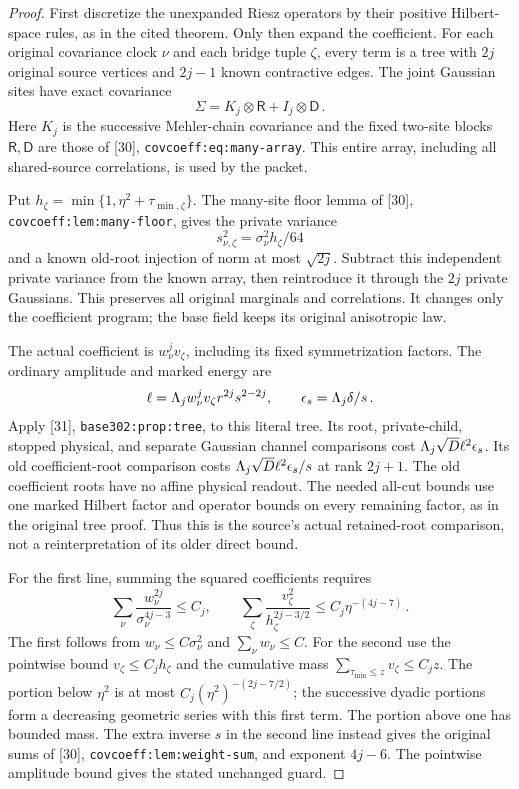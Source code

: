\documentclass[11pt]{article}
\numberwithin{equation}{section}
\theoremstyle{remark}\newtheorem{remark}[theorem]{Remark}
\newcommand{\src}[1]{\texttt{\nolinkurl{#1}}}
\begin{document}
\begin{proof}
First discretize the unexpanded Riesz operators by their positive
Hilbert-space rules, as in the cited theorem. Only then expand the
coefficient. For each original covariance clock $\nu$ and each bridge
tuple $\zeta$, every term is a tree with $2j$ original source vertices
and $2j-1$ known contractive edges. The joint Gaussian sites have
exact covariance
\[
 \Sigma=K_j\otimes\mathsf R+I_j\otimes\mathsf D\,.
\]
Here $K_j$ is the successive Mehler-chain covariance and the fixed
two-site blocks $\mathsf R,\mathsf D$ are those of [30],
\src{covcoeff:eq:many-array}. This entire array, including all
shared-source correlations, is used by the packet.

Put $h_\zeta=\min\{1,\eta^2+\tau_{\min,\zeta}\}$.
The many-site floor lemma of [30], \src{covcoeff:lem:many-floor},
gives the private variance
\[
 s_{\nu,\zeta}^2=\sigma_\nu^2h_\zeta/64
\]
and a known old-root injection of norm at most $\sqrt{2j}$.
Subtract this independent private variance from the known array,
then reintroduce it through the $2j$ private Gaussians. This preserves
all original marginals and correlations. It changes only the
coefficient program; the base field keeps its original anisotropic law.

The actual coefficient is $w_\nu^jv_\zeta$, including its fixed
symmetrization factors. The ordinary amplitude and marked energy are
\[
 \ell=\Lambda_jw_\nu^jv_\zeta r^{2j}s^{2-2j},\qquad
 \epsilon_s=\Lambda_j\delta/s\,.
\]
Apply [31], \src{base302:prop:tree}, to this literal tree.
Its root, private-child, stopped physical, and separate Gaussian
channel comparisons cost $\Lambda_j\sqrt D\ell^2\epsilon_s$.
Its old coefficient-root comparison costs
$\Lambda_j\sqrt D\ell^2\epsilon_s/s$ at rank $2j+1$.
The old coefficient roots have no affine physical readout.
The needed all-cut bounds use one marked Hilbert factor and
operator bounds on every remaining factor, as in the original tree
proof. Thus this is the source's actual retained-root comparison,
not a reinterpretation of its older direct bound.

For the first line, summing the squared coefficients requires
\[
 \sum_\nu\frac{w_\nu^{2j}}{\sigma_\nu^{4j-3}}\le C_j,
 \qquad
 \sum_\zeta\frac{v_\zeta^2}{h_\zeta^{2j-3/2}}
       \le C_j\eta^{-(4j-7)}\,.
\]
The first follows from $w_\nu\le C\sigma_\nu^2$ and
$\sum_\nu w_\nu\le C$. For the second use the pointwise bound
$v_\zeta\le C_jh_\zeta$ and the cumulative mass
$\sum_{\tau_{\min}\le z}v_\zeta\le C_jz$.
The portion below $\eta^2$ is at most
$C_j(\eta^2)^{-(2j-7/2)}$; the successive dyadic portions form
a decreasing geometric series with this first term. The portion
above one has bounded mass. The extra inverse $s$ in the second
line instead gives the original sums of [30],
\src{covcoeff:lem:weight-sum}, and exponent $4j-6$.
The pointwise amplitude bound gives the stated unchanged guard.


\end{proof}
\end{document}
